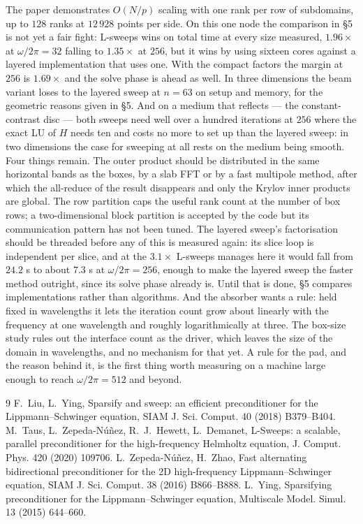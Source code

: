 \documentclass[11pt]{article}
\begin{document}
The paper demonstrates $O(N/p)$ scaling with one rank per row of subdomains, up to $128$
ranks at $12\,928$ points per side. On this one node the comparison in \S5 is not yet a
fair fight: L-sweeps wins on total time at every size measured, $1.96\times$ at
$\omega/2\pi=32$ falling to $1.35\times$ at $256$, but it wins by using sixteen cores
against a layered implementation that uses one. With the compact factors the margin at
$256$ is $1.69\times$ and the solve phase is ahead as well. In three dimensions the beam
variant loses to the layered sweep at $n=63$ on setup and memory, for the geometric
reasons given in \S5. And on a medium that reflects --- the constant-contrast disc ---
both sweeps need well over a hundred iterations at $256$ where the exact LU of $H$ needs
ten and costs no more to set up than the layered sweep: in two dimensions the case for
sweeping at all rests on the medium being smooth. Four things remain. The outer product should be distributed in the
same horizontal bands as the boxes, by a slab FFT or by a fast multipole method, after
which the all-reduce of the result disappears and only the Krylov inner products are
global. The row partition caps the useful rank count at the
number of box rows; a two-dimensional block partition is accepted by the code but its
communication pattern has not been tuned. The layered sweep's factorisation should be threaded before any of this is measured
again: its slice loop is independent per slice, and at the $3.1\times$ L-sweeps manages
here it would fall from $24.2$ s to about $7.3$ s at $\omega/2\pi=256$, enough to make the
layered sweep the faster method outright, since its solve phase already is. Until that is
done, \S5 compares implementations rather than algorithms. And the absorber wants a rule: held fixed in
wavelengths it lets the iteration count grow about linearly with the frequency at one
wavelength and roughly logarithmically at three. The box-size study rules out the
interface count as the driver, which leaves the size of the domain in wavelengths, and no
mechanism for that yet. A rule for the pad, and the reason behind it, is the first thing
worth measuring on a machine large enough to reach $\omega/2\pi=512$ and beyond.

\begin{thebibliography}{9}
 F.~Liu, L.~Ying, Sparsify and sweep: an efficient preconditioner for
the Lippmann--Schwinger equation, SIAM J. Sci. Comput. 40 (2018) B379--B404.
 M.~Taus, L.~Zepeda-N\'u\~nez, R.~J.~Hewett, L.~Demanet, L-Sweeps: a
scalable, parallel preconditioner for the high-frequency Helmholtz equation, J. Comput.
Phys. 420 (2020) 109706.
 L.~Zepeda-N\'u\~nez, H.~Zhao, Fast alternating bidirectional
preconditioner for the 2D high-frequency Lippmann--Schwinger equation, SIAM J. Sci.
Comput. 38 (2016) B866--B888.
 L.~Ying, Sparsifying preconditioner for the Lippmann--Schwinger
equation, Multiscale Model. Simul. 13 (2015) 644--660.
\end{thebibliography}
\end{document}
